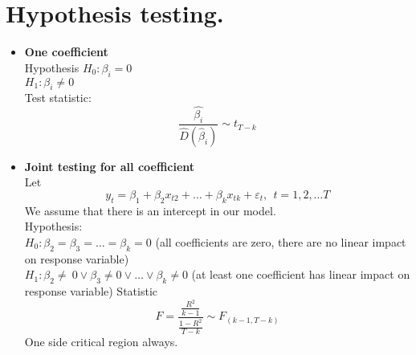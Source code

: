 \documentclass{book}
\begin{document}
\section{Hypothesis testing.}
\begin{itemize}
\item \textbf{One coefficient}\\
Hypothesis
$H_{0}:\beta_{i}=0$\\
$H_{1}:\beta_{i}\neq 0$\\
Test statistic:\\
\begin{equation}
\nonumber
\frac{\hat{\beta_{i}}}{\hat{D}(\hat{\beta}_{i})}\sim t_{T-k}
\end{equation}
\item\textbf{Joint testing for all coefficient}\\
Let\\ 
\begin{equation}
\nonumber
y_{t}=\beta_{1}+\beta_{2}x_{t2}+\dots+\beta_{k}x_{tk}+\varepsilon_{t},\ \ t=1,2,\dots T
\end{equation}
We assume that there is an intercept in our model.\\
Hypothesis:\\
$H_{0}: \beta_{2}=\beta_{3}=\dots=\beta_{k}=0$ (all coefficients are zero, there are no linear impact on response variable)\\
$H_{1}:\beta_{2}\neq\ 0 \vee \beta_{3}\neq 0 \vee\dots\vee\beta_{k}\neq 0 $ (at least one coefficient has linear impact on response variable)
Statistic
\begin{equation}
\nonumber
F=\frac{\frac{R^2}{k-1}}{\frac{1-R^2}{T-k}}\sim F_{(k-1,T-k)}
\end{equation}
One side critical region always.
\end{itemize}
\end{document}
